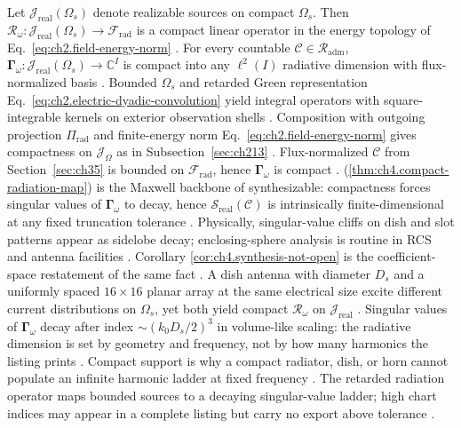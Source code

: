 \label{thm:ch4.compact-radiation-map}
Let \(\mathcal{J}_{\mathrm{real}}(\Omega_{s})\) denote realizable sources on compact \(\Omega_{s}\). Then
\(\mathcal{R}_\omega:\mathcal{J}_{\mathrm{real}}(\Omega_{s})\to\mathcal{F}_{\mathrm{rad}}\) is a compact linear
operator in the energy topology of Eq.~\eqref{eq:ch2.field-energy-norm} \cite{stratton1941}. For
every countable \(\mathcal{C}\in\mathcal{R}_{\mathrm{adm}}\),
\(\boldsymbol{\Gamma}_\omega:\mathcal{J}_{\mathrm{real}}(\Omega_{s})\to\mathbb{C}^{I}\) is compact into any
\(\ell^{2}(I)\) radiative dimension with flux-normalized basis \cite{hansen1988}.
Bounded \(\Omega_{s}\) and retarded Green representation
Eq.~\eqref{eq:ch2.electric-dyadic-convolution} yield integral operators with square-integrable kernels on
exterior observation shells \cite{stratton1941}. Composition with outgoing projection
\(\Pi_{\mathrm{rad}}\) and finite-energy norm Eq.~\eqref{eq:ch2.field-energy-norm} gives compactness on
\(\mathcal{J}_\Omega\) as in Subsection~\ref{sec:ch213} \cite{harrington2001}. Flux-normalized
\(\mathcal{C}\) from Section~\ref{sec:ch35} is bounded on \(\mathcal{F}_{\mathrm{rad}}\), hence
\(\boldsymbol{\Gamma}_\omega\) is compact \cite{hansen1988}.
(\ref{thm:ch4.compact-radiation-map}) is the Maxwell backbone of synthesizable: compactness forces
singular values of \(\boldsymbol{\Gamma}_\omega\) to decay, hence \(\mathcal{S}_{\mathrm{real}}(\mathcal{C})\) is
intrinsically finite-dimensional at any fixed truncation tolerance \cite{harrington2001}.
Physically, singular-value cliffs on dish and slot patterns appear as sidelobe decay; enclosing-sphere analysis is routine in RCS and antenna facilities \cite{hansen1988}.
Corollary
\ref{cor:ch4.synthesis-not-open} is the coefficient-space restatement of the same fact \cite{hansen1988}.
A dish antenna with diameter $D_{s}$ and a uniformly spaced $16\times16$ planar array at the same electrical
size excite different current distributions on $\Omega_{s}$, yet both yield compact $\mathcal{R}_\omega$ on
$\mathcal{J}_{\mathrm{real}}$ \cite{stratton1941}.
Singular values of $\boldsymbol{\Gamma}_\omega$ decay after index $\sim (k_{0}D_{s}/2)^{3}$ in volume-like scaling:
the radiative dimension is set by geometry and frequency, not by how many harmonics the listing prints
\cite{hansen1988}.
Compact support is why a compact radiator, dish, or horn cannot populate an infinite harmonic ladder at fixed frequency \cite{stratton1941}. The retarded radiation operator maps bounded sources to a decaying singular-value ladder; high chart indices may appear in a complete listing but carry no export above tolerance \cite{hansen1988}.
